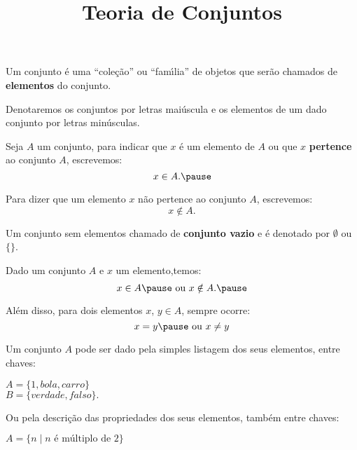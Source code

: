 \documentclass{beamer}
\title{Teoria de Conjuntos}
\author[\autor]{\autor}
\institute[\instituto]{\instituto}
\date{}
\begin{document}
    \begin{frame}
        \maketitle
    \end{frame}


    \begin{frame}
        \vspace{.4cm}
        Um conjunto {\'e} \pause uma ``cole{\c c}{\~a}o'' \pause ou ``fam{\'\i}lia'' \pause de objetos que ser\~ao chamados de \textbf{elementos} do conjunto.\pause

        \vspace{.4cm}

        Denotaremos os conjuntos por letras mai\'uscula \pause e os elementos de um dado conjunto por letras min{\'u}sculas.\pause

        \vspace{.4cm}
        Seja $A$ um conjunto, \pause para indicar que $x$ {\'e} \pause um elemento de $A$ \pause ou que $x$ \textbf{pertence} ao conjunto $A$, \pause escrevemos:
        \[
            x \in A.\pause
        \]

        Para dizer que um elemento $x$ \pause n{\~a}o pertence ao conjunto $A$, escrevemos:\pause
        \[
            x \notin A.
        \]
    \end{frame}

    \begin{frame}
        Um conjunto sem elementos  chamado de \textbf{conjunto vazio} \pause e {\'e} denotado por \pause $\emptyset$ ou \pause $\{\}$.\pause

        \vspace{.4cm}
        Dado um conjunto $A$ \pause e $x$ um elemento,\pause temos:\pause
        \[
            x \in A\pause \mbox{ ou } x \notin A.\pause
        \]

        Al{\'e}m disso, \pause para dois elementos \pause $x$, $y \in A$, \pause sempre ocorre:\pause
        \[
            x = y\pause \mbox{ ou } x \neq y
        \]
    \end{frame}

    \begin{frame}
        \vspace{.4cm}
        Um conjunto $A$ pode ser dado pela simples listagem dos seus elementos, entre chaves:\pause
            \begin{center}
                $A = \{1, bola, carro\}$\pause\\
                $B = \{verdade, falso\}.$\pause
            \end{center}


        Ou pela descri{\c c}{\~a}o das propriedades dos seus elementos, tamb\'em  entre chaves:\pause
        \begin{center}
            $A = \{n \mid n \mbox{ \'e m{\'u}ltiplo de } 2\}$\pause
        \end{center}
    \end{frame}
\end{document}
